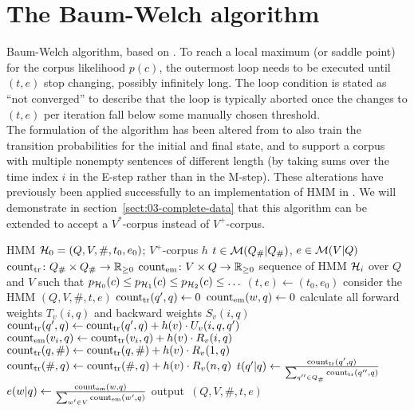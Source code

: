 \section{The Baum-Welch algorithm}

\begin{algorithm}[p!]
 \caption{Baum-Welch algorithm, based on \cite[p.~226]{jm09}. To reach a local
 maximum (or saddle point) for the corpus likelihood $p(c)$, the outermost loop
 needs to be executed until $(t,e)$ stop changing, possibly infinitely long.
 The loop condition is stated as ``not converged'' to describe that the loop is
 typically aborted once the changes to $(t,e)$ per iteration fall below some
 manually chosen threshold.\\[1em]
 The formulation of the algorithm has been altered from \cite{jm09} to also
 train the transition probabilities for the initial and final state, and to
 support a corpus with multiple nonempty sentences of different length (by
 taking sums over the time index $i$ in the E-step rather than in the M-step).
 These alterations have previously been applied successfully to an implementation
 of HMM in \cite{nel13}. We will demonstrate in
 section~\ref{sect:03-complete-data} that this algorithm can be extended to
 accept a $V^*$-corpus instead of $V^+$-corpus. \label{alg:bw-vogler}}
 \begin{algorithmic}[1]
  \algorithmheader[Input:] HMM $\mathcal H_0 = (Q,V,\#,t_0,e_0)$; $V^+$-corpus $h$
  \algorithmheader[Variables:] $t\in\mathcal M(Q_\#|Q_\#)$, $e\in\mathcal M(V|Q)$
  \algorithmheader             $\operatorname{count}_\mathrm{tr}\colon Q_\#\times Q_\#\to\mathbb R_{\geq0}$
  \algorithmheader             $\operatorname{count}_\mathrm{em}\colon V\times Q\to\mathbb R_{\geq0}$
  \algorithmheader[Output:] sequence of HMM $\mathcal H_i$ over $Q$ and $V$
  \algorithmheader such that $p_{\mathcal H_0}(c) \leq p_{\mathcal H_1}(c) \leq p_{\mathcal H_2}(c) \leq \ldots$
  \STATE $(t,e) \leftarrow (t_0,e_0)$
   \STATE consider the HMM $(Q,V,\#,t,e)$
   \STATE $\operatorname{count}_\mathrm{tr}(q',q) \leftarrow 0$ 
   \STATE $\operatorname{count}_\mathrm{em}(w,q) \leftarrow 0$ 
    \STATE calculate all forward weights $T_v(i,q)$ and backward weights $S_v(i,q)$
      \STATE $\operatorname{count}_\mathrm{tr}(q',q) \leftarrow \operatorname{count}_\mathrm{tr}(q',q) + h(v) \cdot U_v(i,q,q')$
     \ENDFOR
    \ENDFOR
      \STATE $\operatorname{count}_\mathrm{em}(v_i,q) \leftarrow \operatorname{count}_\mathrm{tr}(v_i,q) + h(v) \cdot R_v(i,q)$
     \ENDFOR
    \ENDFOR
     \STATE $\operatorname{count}_\mathrm{tr}(q,\#) \leftarrow \operatorname{count}_\mathrm{tr}(q,\#) + h(v) \cdot R_v(1,q)$
     \STATE $\operatorname{count}_\mathrm{tr}(\#,q) \leftarrow \operatorname{count}_\mathrm{tr}(\#,q) + h(v) \cdot R_v(n,q)$
    \ENDFOR
   \ENDFOR
    \STATE $t(q'|q) \leftarrow \frac{\operatorname{count}_\mathrm{tr}(q',q)}{\sum_{q''\in Q_\#} \operatorname{count}_\mathrm{tr}(q'',q)}$
   \ENDFOR
    \STATE $e(w|q) \leftarrow \frac{\operatorname{count}_\mathrm{em}(w,q)}{\sum_{w'\in V} \operatorname{count}_\mathrm{em}(w',q)}$
   \ENDFOR
   \STATE output~$(Q,V,\#,t,e)$
  \ENDWHILE
 \end{algorithmic}
\end{algorithm}

